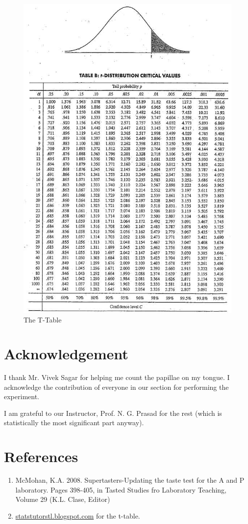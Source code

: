 	\begin{figure}[bth]
		\begin{center}
			\includegraphics[width=1.1\linewidth]{gfx/t-table}
		\end{center}
	\caption[The T-Table]{The T-Table}
	\label{t_table}
	\end{figure}	


\section{Acknowledgement}
	I thank Mr. Vivek Sagar for helping me count the papillae on my tongue. I acknowledge the contribution of everyone in our section for performing the experiment.
	\par
	I am grateful to our Instructor, Prof. N. G. Prasad for the rest (which is statistically the most significant part anyway).

\section{References}
	\begin{enumerate}
		\item 	McMohan, K.A. 2008. Supertasters-Updating the taste test for the A and P laboratory. Pages 398-405, in Tasted Studies fro Laboratory Teaching, Volume 29 (K.L. Clase, Editor)
		\item \url{statstutorstl.blogspot.com} for the t-table.
	\end{enumerate}